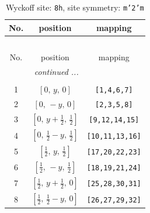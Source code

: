 \documentclass[fleqn,8pt]{jsarticle}
\begin{document}
\begin{longtable}{ccc}
\caption{Wyckoff site: {\tt 8h}, site symmetry: {\tt m'2'm}}
 \\
 \hline \hline
No. & position & mapping \\ \hline \endfirsthead

\multicolumn{2}{l}{\tablename\ \thetable{}} \\
 \hline \hline
No. & position & mapping \\ \hline \endhead

 \hline \hline
\multicolumn{2}{r}{\footnotesize\it continued ...} \\ \endfoot

 \hline \hline
\multicolumn{2}{r}{} \\ \endlastfoot

1 & $\left[ 0,\, y,\, 0 \right]$ & {\tt [1,4,6,7]} \\ \hline
2 & $\left[ 0,\, - y,\, 0 \right]$ & {\tt [2,3,5,8]} \\ \hline
3 & $\left[ 0,\, y + \frac{1}{2},\, \frac{1}{2} \right]$ & {\tt [9,12,14,15]} \\ \hline
4 & $\left[ 0,\, \frac{1}{2} - y,\, \frac{1}{2} \right]$ & {\tt [10,11,13,16]} \\ \hline
5 & $\left[ \frac{1}{2},\, y,\, \frac{1}{2} \right]$ & {\tt [17,20,22,23]} \\ \hline
6 & $\left[ \frac{1}{2},\, - y,\, \frac{1}{2} \right]$ & {\tt [18,19,21,24]} \\ \hline
7 & $\left[ \frac{1}{2},\, y + \frac{1}{2},\, 0 \right]$ & {\tt [25,28,30,31]} \\ \hline
8 & $\left[ \frac{1}{2},\, \frac{1}{2} - y,\, 0 \right]$ & {\tt [26,27,29,32]} \\
\end{longtable}
\renewcommand{\arraystretch}{1.2}
\end{document}
